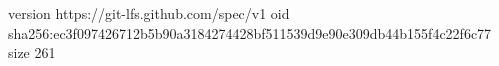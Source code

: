 version https://git-lfs.github.com/spec/v1
oid sha256:ec3f097426712b5b90a3184274428bf511539d9e90e309db44b155f4c22f6c77
size 261
